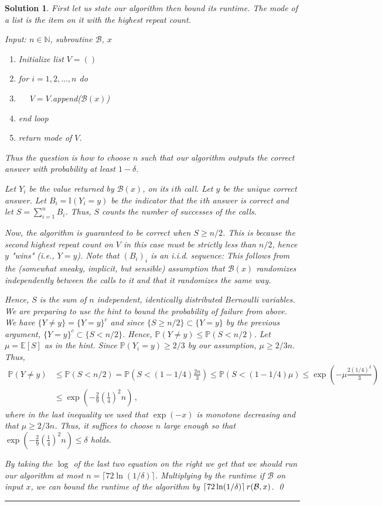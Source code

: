 \documentclass{article}
\DeclareMathOperator*{\1}{\mathbbm{1}}
\newcommand{\E}{\mathbb E}
\newcommand{\Prob}[1]{\mathbb{P}( #1 )}
\newcommand{\Probg}[1]{\mathbb{P}\left( #1 \right)}
\newcommand{\EE}[1]{\E[#1]}
\newtheorem*{solution*}{Solution}
\begin{document}
\begin{solution*}
First let us state our algorithm then bound its runtime.
The mode of a list is the item on it with the highest repeat count.

\medskip
\noindent Input: $n \in \mathbb{N}$, subroutine $\mathcal{B}$, $x$
\begin{enumerate}
    \item Initialize list $V = ()$
    \item for $i = 1,2,...,n$ do
    \item $\quad$ $V = V$.append($\mathcal{B}(x)$)
    \item end loop
    \item return mode of $V$.
\end{enumerate}
\newcommand{\one}[1]{\mathbb{I}(#1)}
Thus the question is how to choose $n$ such that our algorithm outputs the correct answer with probability at least $1-\delta$. 

Let $Y_i$ be the value returned by $\mathcal{B}(x)$, on its $i$th call.
Let $y$ be the unique correct answer.
Let $B_i = \one{Y_i=y}$ be the indicator that the $i$th answer is correct and let
$S = \sum_{i=1}^n B_i$. Thus, $S$ counts the number of successes of the calls.

Now, the algorithm is guaranteed to be correct when $S\ge n/2$. This is because the second highest repeat count on $V$ in this case must be strictly less than $n/2$, hence $y$ "wins" (i.e., $Y=y$).
Note that $(B_i)_i$ is an i.i.d. sequence: This follows from the (somewhat sneaky, implicit, but sensible) assumption that $\mathcal{B}(x)$ randomizes independently between the calls to it and that it randomizes the same way.

Hence, $S$ is the sum of $n$ independent, identically distributed Bernoulli variables. 
We are preparing to use the hint to bound the probability of failure from above.
We have $\{ Y \ne y \} = \{ Y = y \}^c$ and since $\{S\ge n/2\} \subset \{Y=y\}$ by the previous argument,
$\{Y=y\}^c \subset \{S<n/2\}$. Hence, $\Prob{Y\ne y} \le \Prob{ S<n/2 }$.
Let $\mu = \EE{S}$ as in the hint. Since $\Prob{Y_i=y}\ge 2/3$ by our assumption, $\mu\ge 2/3 n$.
Thus,
\begin{align*}
\Probg{Y\ne y} 
& \le \Probg{ S<n/2 } 
= \Probg{ S<(1-1/4) \frac{2n}{3} } 
\le \Probg{ S< (1-1/4) \mu }
\le \exp\left(-\mu \frac{2(1/4)^2}{3} \right) \\
& \le \exp\left( - \frac{2}{9} \left(\frac14\right)^2 n \right)\,,
\end{align*}
where in the last inequality we used that $\exp(-x)$ is monotone decreasing and that $\mu\ge 2/3 n$.
Thus, it suffices to choose $n$ large enough so that 
$\exp\left( - \frac{2}{9} \left(\frac14\right)^2 n \right)\le \delta$ holds.

By taking the $\log$ of the last two equation on the right we get that we should run our algorithm at most $n = \lceil 72 \ln(1/\delta) \rceil $. Multiplying by the runtime if $\mathcal{B}$ on input $x$, we can bound the runtime of the algorithm by $\lceil 72 \ln(1/\delta) \rceil \, r(\mathcal{B},x)$.
\qed\par\bigskip\par\hrule
\end{solution*}
\end{document}
